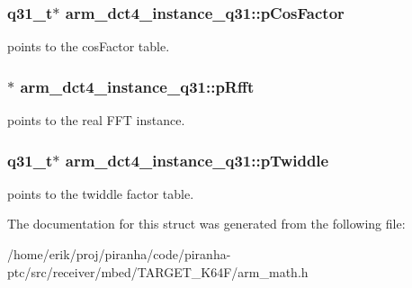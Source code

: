 \subsubsection[{\texorpdfstring{p\+Cos\+Factor}{pCosFactor}}]{\setlength{\rightskip}{0pt plus 5cm}q31\+\_\+t$\ast$ arm\+\_\+dct4\+\_\+instance\+\_\+q31\+::p\+Cos\+Factor}\hypertarget{structarm__dct4__instance__q31_af97204d1838925621fc82021a0c2d6c1}{}\label{structarm__dct4__instance__q31_af97204d1838925621fc82021a0c2d6c1}
points to the cos\+Factor table. 
\subsubsection[{\texorpdfstring{p\+Rfft}{pRfft}}]{$\ast$ arm\+\_\+dct4\+\_\+instance\+\_\+q31\+::p\+Rfft}\hypertarget{structarm__dct4__instance__q31_af1487dab5e7963b85dc0fdc6bf492542}{}\label{structarm__dct4__instance__q31_af1487dab5e7963b85dc0fdc6bf492542}
points to the real F\+FT instance. 
\subsubsection[{\texorpdfstring{p\+Twiddle}{pTwiddle}}]{\setlength{\rightskip}{0pt plus 5cm}q31\+\_\+t$\ast$ arm\+\_\+dct4\+\_\+instance\+\_\+q31\+::p\+Twiddle}\hypertarget{structarm__dct4__instance__q31_a7db236e22673146bb1d2c962f0713f08}{}\label{structarm__dct4__instance__q31_a7db236e22673146bb1d2c962f0713f08}
points to the twiddle factor table. 

The documentation for this struct was generated from the following file\+:\begin{DoxyCompactItemize}
\item 
/home/erik/proj/piranha/code/piranha-\/ptc/src/receiver/mbed/\+T\+A\+R\+G\+E\+T\+\_\+\+K64\+F/arm\+\_\+math.\+h\end{DoxyCompactItemize}
